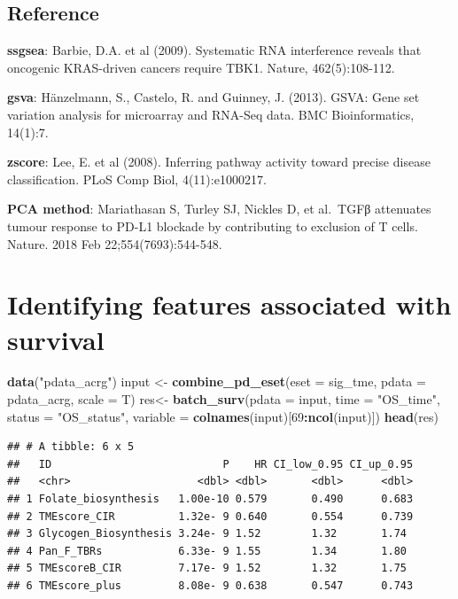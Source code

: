 \documentclass[
  12pt,
]{book}
\newenvironment{Shaded}{\begin{snugshade}}{\end{snugshade}}
\newcommand{\AttributeTok}[1]{\textcolor[rgb]{0.13,0.29,0.53}{#1}}
\newcommand{\DecValTok}[1]{\textcolor[rgb]{0.00,0.00,0.81}{#1}}
\newcommand{\FunctionTok}[1]{\textcolor[rgb]{0.13,0.29,0.53}{\textbf{#1}}}
\newcommand{\NormalTok}[1]{#1}
\newcommand{\OtherTok}[1]{\textcolor[rgb]{0.56,0.35,0.01}{#1}}
\newcommand{\SpecialCharTok}[1]{\textcolor[rgb]{0.81,0.36,0.00}{\textbf{#1}}}
\newcommand{\StringTok}[1]{\textcolor[rgb]{0.31,0.60,0.02}{#1}}
\begin{document}
\hypertarget{reference}{%
\subsection{Reference}\label{reference}}

\textbf{ssgsea}: Barbie, D.A. et al (2009). Systematic RNA interference reveals that oncogenic KRAS-driven cancers require TBK1. Nature, 462(5):108-112.

\textbf{gsva}: Hänzelmann, S., Castelo, R. and Guinney, J. (2013). GSVA: Gene set variation analysis for microarray and RNA-Seq data. BMC Bioinformatics, 14(1):7.

\textbf{zscore}: Lee, E. et al (2008). Inferring pathway activity toward precise disease classification. PLoS Comp Biol, 4(11):e1000217.

\textbf{PCA method}: Mariathasan S, Turley SJ, Nickles D, et al.~TGFβ attenuates tumour response to PD-L1 blockade by contributing to exclusion of T cells. Nature. 2018 Feb 22;554(7693):544-548.

\hypertarget{identifying-features-associated-with-survival}{%
\section{Identifying features associated with survival}\label{identifying-features-associated-with-survival}}

\begin{Shaded}
\begin{Highlighting}[]
\FunctionTok{data}\NormalTok{(}\StringTok{"pdata\_acrg"}\NormalTok{)}
\NormalTok{input }\OtherTok{\textless{}{-}} \FunctionTok{combine\_pd\_eset}\NormalTok{(}\AttributeTok{eset =}\NormalTok{ sig\_tme, }\AttributeTok{pdata =}\NormalTok{ pdata\_acrg, }\AttributeTok{scale =}\NormalTok{ T)}
\NormalTok{res}\OtherTok{\textless{}{-}} \FunctionTok{batch\_surv}\NormalTok{(}\AttributeTok{pdata    =}\NormalTok{ input,}
                 \AttributeTok{time     =} \StringTok{"OS\_time"}\NormalTok{, }
                 \AttributeTok{status   =} \StringTok{"OS\_status"}\NormalTok{, }
                 \AttributeTok{variable =} \FunctionTok{colnames}\NormalTok{(input)[}\DecValTok{69}\SpecialCharTok{:}\FunctionTok{ncol}\NormalTok{(input)])}
\FunctionTok{head}\NormalTok{(res)}
\end{Highlighting}
\end{Shaded}

\begin{verbatim}
## # A tibble: 6 x 5
##   ID                           P    HR CI_low_0.95 CI_up_0.95
##   <chr>                    <dbl> <dbl>       <dbl>      <dbl>
## 1 Folate_biosynthesis   1.00e-10 0.579       0.490      0.683
## 2 TMEscore_CIR          1.32e- 9 0.640       0.554      0.739
## 3 Glycogen_Biosynthesis 3.24e- 9 1.52        1.32       1.74 
## 4 Pan_F_TBRs            6.33e- 9 1.55        1.34       1.80 
## 5 TMEscoreB_CIR         7.17e- 9 1.52        1.32       1.75 
## 6 TMEscore_plus         8.08e- 9 0.638       0.547      0.743
\end{verbatim}
\end{document}
